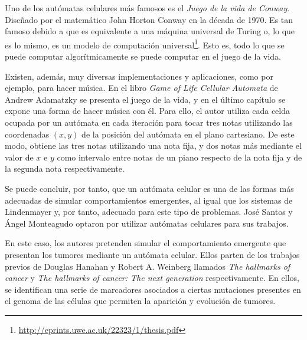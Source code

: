 Uno de los autómatas celulares más famosos es el \textit{Juego de la vida de Conway}.
Diseñado por el matemático John Horton Conway en la década de 1970. Es tan famoso debido a
que es equivalente a una máquina universal de Turing o, lo que es lo mismo, es un modelo de computación universal\footnote{\url{http://eprints.uwe.ac.uk/22323/1/thesis.pdf}}.
Esto es, todo lo que se puede computar algorítmicamente se puede computar en el juego de la vida.

Existen, además, muy diversas implementaciones y aplicaciones, como por ejemplo, para hacer música.
En el libro \textit{Game of Life Cellular Automata} de Andrew Adamatzky \cite{game-of-life} se presenta
el juego de la vida, y en el último capítulo se expone una forma de hacer música con él. Para ello, el autor
utiliza cada celda ocupada por un autómata en cada iteración para tocar tres notas utilizando
las coordenadas $(x,y)$ de la posición del autómata en el plano cartesiano. De este modo,
obtiene las tres notas utilizando una nota fija, y dos notas más mediante el valor de
$x$ e $y$ como intervalo entre notas de un piano respecto de la nota fija y de la segunda nota
respectivamente.

Se puede concluir, por tanto, que un autómata celular es una de las formas más adecuadas de simular comportamientos emergentes,
al igual que los sistemas de Lindenmayer y, por tanto, adecuado para este tipo de problemas.
José Santos y Ángel Monteagudo \cite{jsantos-amonteagudo-1-2014} optaron por utilizar autómatas celulares para sus trabajos.

En este caso, los autores pretenden simular el comportamiento emergente que presentan los
tumores mediante un autómata celular. Ellos parten de los trabajos previos de Douglas Hanahan y Robert A. Weinberg
llamados \textit{The hallmarks of cancer} \cite{hanahan-weinberg-2000} y \textit{The hallmarks of cancer: The next generation} \cite{hanahan-weinberg-2011}
respectivamente. En ellos, se identifican una serie de marcadores asociados a ciertas mutaciones presentes
en el genoma de las células que permiten la aparición y evolución de tumores.
